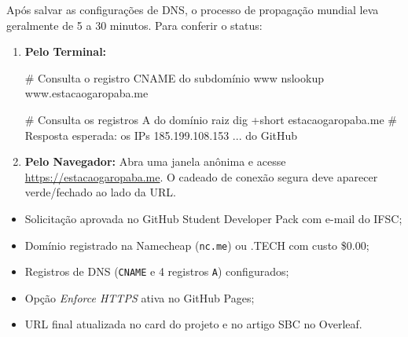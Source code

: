 \begin{boxTeste}
Após salvar as configurações de DNS, o processo de propagação mundial leva geralmente de 5 a 30 minutos. Para conferir o status:
\begin{enumerate}
  \item \textbf{Pelo Terminal:}
\begin{saida}
# Consulta o registro CNAME do subdomínio www
nslookup www.estacaogaropaba.me

# Consulta os registros A do domínio raiz
dig +short estacaogaropaba.me
# Resposta esperada: os IPs 185.199.108.153 ... do GitHub
\end{saida}
  \item \textbf{Pelo Navegador:} Abra uma janela anônima e acesse \url{https://estacaogaropaba.me}. O cadeado de conexão segura deve aparecer verde/fechado ao lado da URL.
\end{enumerate}
\end{boxTeste}

\begin{boxChecklist}
\begin{itemize}[label={\faSquare[regular]}]
  \item Solicitação aprovada no GitHub Student Developer Pack com e-mail do IFSC;
  \item Domínio registrado na Namecheap (\texttt{nc.me}) ou .TECH com custo \$0.00;
  \item Registros de DNS (\texttt{CNAME} e 4 registros \texttt{A}) configurados;
  \item Opção \textit{Enforce HTTPS} ativa no GitHub Pages;
  \item URL final atualizada no card do projeto e no artigo SBC no Overleaf.
\end{itemize}
\end{boxChecklist}
